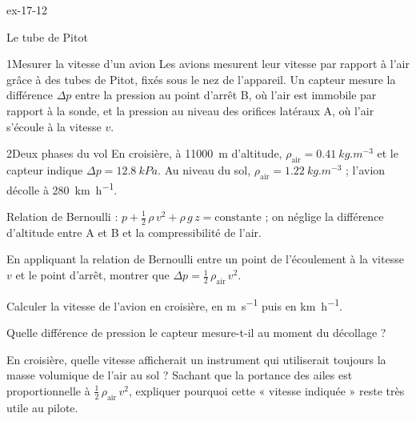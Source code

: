 \begin{blocLivre}{ex-17-12}
\begin{exercice}[3]{Le tube de Pitot}
\begin{docu}{1}{Mesurer la vitesse d'un avion}
Les avions mesurent leur vitesse par rapport à l'air grâce à des tubes de Pitot, fixés sous le nez de l'appareil. Un
capteur mesure la différence $\Delta p$ entre la pression au point d'arrêt B, où l'air est immobile par rapport à la
sonde, et la pression au niveau des orifices latéraux A, où l'air s'écoule à la vitesse $v$.
\end{docu}
\begin{docu}{2}{Deux phases du vol}
En croisière, à \qty{11000}{m} d'altitude, $\rho_\mathrm{air}=\qty{0,41}{kg.m^{-3}}$ et le capteur indique
$\Delta p=\qty{12,8}{kPa}$. Au niveau du sol, $\rho_\mathrm{air}=\qty{1,22}{kg.m^{-3}}$ ; l'avion décolle à \qty{280}{km.h^{-1}}.
\end{docu}
\begin{donnees}
Relation de Bernoulli : $p+\frac12\,\rho\,v^2+\rho\,g\,z=\text{constante}$ ; on néglige la différence d'altitude entre A et B
et la compressibilité de l'air.
\end{donnees}
\begin{questions}
\item En appliquant la relation de Bernoulli entre un point de l'écoulement à la vitesse $v$ et le point d'arrêt, montrer
que $\Delta p=\frac12\,\rho_\mathrm{air}\,v^2$.
\item Calculer la vitesse de l'avion en croisière, en \unit{m.s^{-1}} puis en \unit{km.h^{-1}}.
\item Quelle différence de pression le capteur mesure-t-il au moment du décollage ?
\item \initiative En croisière, quelle vitesse afficherait un instrument qui utiliserait toujours la masse volumique de
l'air au sol ? Sachant que la portance des ailes est proportionnelle à $\frac12\,\rho_\mathrm{air}\,v^2$, expliquer pourquoi
cette « vitesse indiquée » reste très utile au pilote.
\end{questions}
\end{exercice}
\end{blocLivre}
